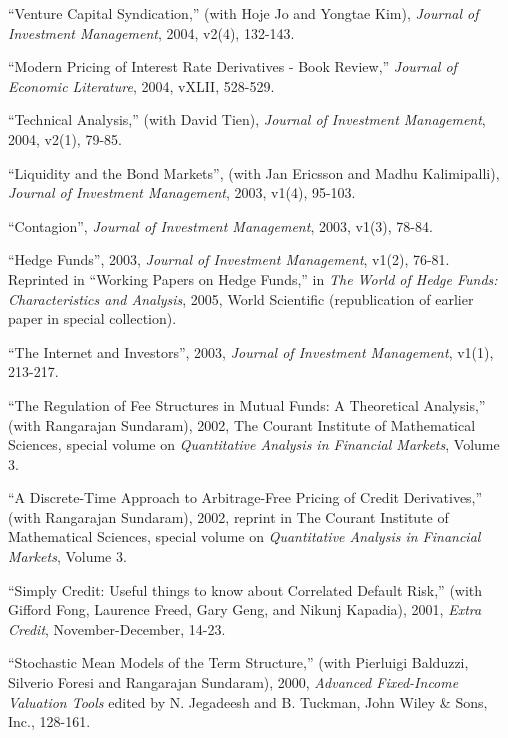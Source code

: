 \documentclass{article}
\begin{document}
\begin{etaremune}
\item ``Venture Capital Syndication,'' (with Hoje Jo and Yongtae Kim), 
{\it Journal of Investment Management}, 2004, v2(4), 132-143. 

\item ``Modern Pricing of Interest Rate Derivatives - Book Review,''
{\it Journal of Economic Literature}, 2004, vXLII, 528-529.

\item ``Technical Analysis,'' (with David Tien),
{\it Journal of Investment Management}, 2004, v2(1), 79-85.

\item ``Liquidity and the Bond Markets'', (with Jan
Ericsson and Madhu Kalimipalli), {\it Journal of
Investment Management}, 2003, v1(4), 95-103.

\item ``Contagion'', {\it Journal of
Investment Management}, 2003, v1(3), 78-84.

\item ``Hedge Funds'', 2003, {\it Journal of
Investment Management}, v1(2), 76-81. Reprinted in
``Working Papers on Hedge Funds,'' in 
{\it The World of Hedge Funds: Characteristics and Analysis}, 
2005, World Scientific (republication of earlier paper in special
collection). 

\item ``The Internet and Investors'', 2003, {\it Journal 
of Investment Management}, v1(1), 213-217.

\item ``The Regulation of Fee Structures in Mutual Funds: A
Theoretical Analysis,'' (with Rangarajan Sundaram), 2002, 
The Courant Institute of Mathematical
Sciences, special volume on {\it Quantitative Analysis in Financial
Markets}, Volume 3. 

\item 
``A Discrete-Time Approach to Arbitrage-Free Pricing of Credit
Derivatives,'' (with Rangarajan Sundaram), 2002,
reprint in The Courant Institute of Mathematical
Sciences, special volume on {\it Quantitative Analysis in Financial
Markets}, Volume 3. 

\item ``Simply Credit: Useful things to know about Correlated
Default Risk,'' (with Gifford Fong, Laurence Freed, Gary Geng, and
Nikunj Kapadia), 2001, {\it Extra Credit}, November-December, 14-23.

\item
``Stochastic Mean Models of the Term Structure,''
(with Pierluigi Balduzzi, Silverio Foresi and Rangarajan Sundaram), 
2000, {\it Advanced Fixed-Income Valuation Tools}
edited by N. Jegadeesh and B. Tuckman,
John Wiley \& Sons, Inc., 128-161.


\end{etaremune}
\end{document}
